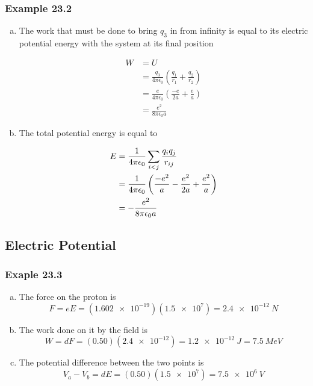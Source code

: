 \documentclass{article}
\begin{document}
\subsubsection{Example 23.2}

\begin{enumerate}[a)]
  \item The work that must be done to bring $q_3$ in from infinity is equal to its electric potential energy with the system at its final position

        \begin{align*}
          W & = U                                                                             \\
            & = \frac{q_3}{4 \pi \epsilon_0} \left( \frac{q_1}{r_1} + \frac{q_2}{r_2} \right) \\
            & = \frac{e}{4 \pi \epsilon_0} \left( \frac{-e}{2a} + \frac{e}{a} \right)         \\
            & = \frac{e^2}{8 \pi \epsilon_0 a}
        \end{align*}

  \item The total potential energy is equal to

        \begin{align*}
          E & = \frac{1}{4 \pi \epsilon_0} \sum_{i < j} \frac{q_i q_j}{r_{ij}}                            \\
            & = \frac{1}{4 \pi \epsilon_0} \left( \frac{-e^2}{a} - \frac{e^2}{2a} + \frac{e^2}{a} \right) \\
            & = -\frac{e^2}{8 \pi \epsilon_0 a}
        \end{align*}
\end{enumerate}

\subsection{Electric Potential}

\subsubsection{Exaple 23.3}

\begin{enumerate}[a)]
  \item The force on the proton is \[F = eE = (\num{1.602e-19})(\num{1.5e7}) = \qty{2.4e-12}{N}\]

  \item The work done on it by the field is \[W = dF = (\num{0.50})(\num{2.4e-12}) = \qty{1.2e-12}{J} = \qty{7.5}{MeV}\]

  \item The potential difference between the two points is \[V_a - V_b = dE = (0.50)(\num{1.5e7}) = \qty{7.5e6}{V}\]
\end{enumerate}
\end{document}
